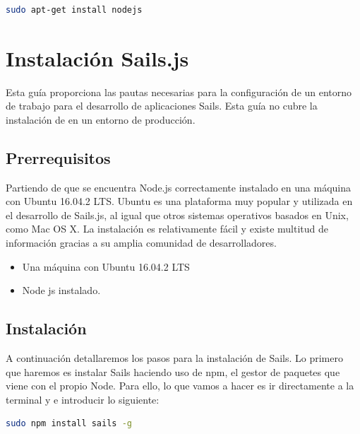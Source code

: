 \begin{appendices}
\begin{lstlisting}[language=bash]
sudo apt-get install nodejs
\end{lstlisting}




\section{Instalación Sails.js}

Esta guía proporciona las pautas necesarias para la configuración de un entorno de trabajo para el desarrollo de aplicaciones Sails. Esta guía no cubre la instalación de en un entorno de producción.\\

\subsection{Prerrequisitos}

Partiendo de que se encuentra Node.js correctamente instalado en una máquina con Ubuntu 16.04.2 LTS. Ubuntu es una plataforma muy popular y utilizada en el desarrollo de Sails.js, al igual que otros sistemas operativos basados en Unix, como Mac OS X. La instalación es relativamente fácil y existe multitud de información gracias a su amplia comunidad de desarrolladores.\\

\begin{itemize}

\item{Una máquina con Ubuntu 16.04.2 LTS }
\item{Node js instalado.}


\end{itemize}

\subsection{Instalación}

A continuación detallaremos los pasos para la instalación de Sails. Lo primero que haremos es instalar Sails haciendo uso de npm, el gestor de paquetes que viene con el propio Node. Para ello, lo que vamos a hacer es ir directamente a la terminal y e introducir lo siguiente:\\

\begin{lstlisting}[language=bash]
sudo npm install sails -g
\end{lstlisting}


\end{appendices}
